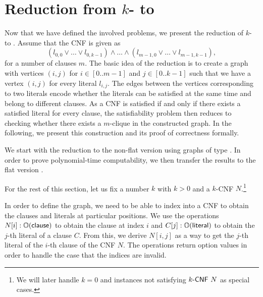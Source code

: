 \section{Reduction from $k$-\SAT{} to \Clique{}}
Now that we have defined the involved problems, we present the reduction of $k$-\SAT{} to \Clique{}. 
Assume that the CNF is given as 
\[(l_{0, 0} \lor \ldots \lor l_{0, k-1}) \land \ldots \land (l_{m-1, 0} \lor \ldots \lor l_{m-1, k-1}), \]
for a number of clauses $m$.
The basic idea of the reduction is to create a graph with vertices $(i, j)$ for $i \in [0..m-1]$ and $j \in [0..k-1]$ such that we have a vertex $(i, j)$ for every literal $l_{i, j}$. The edges between the vertices corresponding to two literals encode whether the literals can be satisfied at the same time and belong to different clauses. As a CNF is satisfied if and only if there exists a satisfied literal for every clause, the satisfiability problem then reduces to checking whether there exists a $m$-clique in the constructed graph. 
In the following, we present this construction and its proof of correctness formally.

We start with the reduction to the non-flat version \Clique{} using graphs of type \UGraph{}. In order to prove polynomial-time computability, we then transfer the results to the flat version \FlatClique{}. 

For the rest of this section, let us fix a number $k$ with $k > 0$ and a $k$-CNF $N$.\footnote{We will later handle $k = 0$ and instances not satisfying $\text{$k$-\textsf{CNF}}~N$ as special cases.}

In order to define the graph, we need to be able to index into a CNF to obtain the clauses and literals at particular positions. 
We use the operations $N[i] : \mathbb{O}{(\textsf{clause})}$ to obtain the clause at index $i$ and $C[j] : \mathbb{O}{(\textsf{literal})}$ to obtain the $j$-th literal of a clause $C$.
From this, we derive $N[i, j]$ as a way to get the $j$-th literal of the $i$-th clause of the CNF $N$. The operations return option values in order to handle the case that the indices are invalid.

